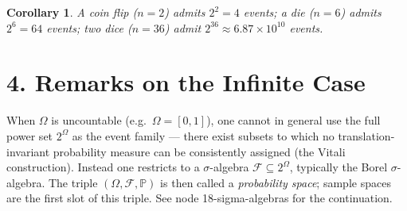 \documentclass[11pt]{article}
\newtheorem{corollary}[theorem]{Corollary}
\theoremstyle{definition}
\begin{document}
\begin{corollary}
A coin flip ($n=2$) admits $2^2 = 4$ events; a die ($n=6$) admits
$2^6 = 64$ events; two dice ($n=36$) admit $2^{36} \approx 6.87 \times
10^{10}$ events.
\end{corollary}

\section*{4. Remarks on the Infinite Case}

When $\Omega$ is uncountable (e.g.\ $\Omega = [0,1]$), one cannot in
general use the full power set $2^{\Omega}$ as the event family --- there
exist subsets to which no translation-invariant probability measure can
be consistently assigned (the Vitali construction). Instead one restricts
to a $\sigma$-algebra $\mathcal{F} \subseteq 2^{\Omega}$, typically the
Borel $\sigma$-algebra. The triple $(\Omega, \mathcal{F}, \mathbb{P})$
is then called a \emph{probability space}; sample spaces are the first
slot of this triple. See node 18-sigma-algebras for the continuation.
\end{document}
